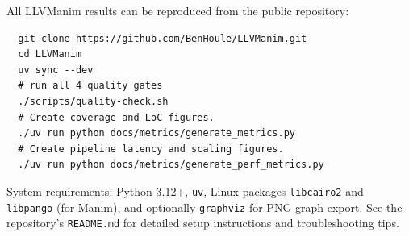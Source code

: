 All LLVManim results can be reproduced from the public repository\cite{llvmanim-repo}:

\begin{verbatim}
  git clone https://github.com/BenHoule/LLVManim.git
  cd LLVManim
  uv sync --dev
  # run all 4 quality gates
  ./scripts/quality-check.sh
  # Create coverage and LoC figures.
  ./uv run python docs/metrics/generate_metrics.py
  # Create pipeline latency and scaling figures.
  ./uv run python docs/metrics/generate_perf_metrics.py
\end{verbatim}
\vspace{-5ex}
\vspace{2ex}

System requirements: Python 3.12+, \texttt{uv}, Linux packages \texttt{libcairo2} and \texttt{libpango} (for Manim), and optionally \texttt{graphviz} for PNG graph export. See the repository's \texttt{README.md} for detailed setup instructions and troubleshooting tips.
